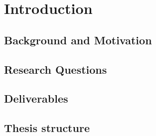 \chapter{Introduction}\label{chap:introduction}
	
	\section{Background and Motivation} \label{sec:backgroundandmotivation}
	\section{Research Questions} \label{sec:researchquestions}
	\section{Deliverables} \label{sec:deliverables}
	\section{Thesis structure} \label{sec:structure}